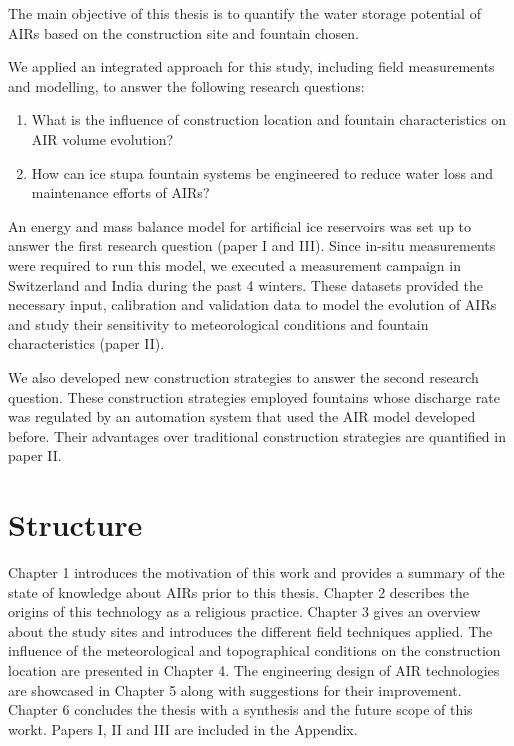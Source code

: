 The main objective of this thesis is to quantify the water storage potential of AIRs based on the construction
site and fountain chosen. 

We applied an integrated approach for this study, including field measurements and modelling, to answer the
following research questions: 

\begin{enumerate}

\item What is the influence of construction location and fountain characteristics on AIR volume evolution? 

\item How can ice stupa fountain systems be engineered to reduce water loss and maintenance efforts of AIRs?

\end{enumerate}

An energy and mass balance model for artificial ice reservoirs was set up to answer the first research question
(paper I and III). Since in-situ measurements were required to run this model, we executed a measurement campaign
in Switzerland and India during the past 4 winters. These datasets provided the necessary input, calibration and
validation data to model the evolution of AIRs and study their sensitivity to meteorological conditions and
fountain characteristics (paper II). 

We also developed new construction strategies to answer the second research question. These construction
strategies employed fountains whose discharge rate was regulated by an automation system that used the AIR model
developed before. Their advantages over traditional construction strategies are quantified in paper II.

\section{Structure}

Chapter 1 introduces the motivation of this work and provides a summary of the state of knowledge about AIRs
prior to this thesis. Chapter 2 describes the origins of this technology as a religious practice. Chapter 3
gives an overview about the study sites and introduces the different field techniques applied. The influence of
the meteorological and topographical conditions on the construction location are presented in Chapter 4. The
engineering design of AIR technologies are showcased in Chapter 5 along with suggestions for their improvement.
Chapter 6 concludes the thesis with a synthesis and the future scope of this workt. Papers I, II and III are included in the
Appendix.


